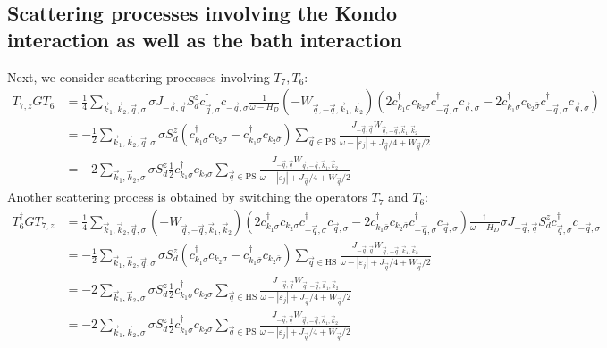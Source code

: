 \documentclass{revtex4-2}
\begin{document}
\subsection{Scattering processes involving the Kondo interaction as well as the bath interaction}
Next, we consider scattering processes involving \(T_7, T_6\):
\begin{equation}\begin{aligned}\label{t7t6}
	T_{7,z} G T_6 &= \frac{1}{4}\sum_{\vec k_1,\vec k_2,\vec q,\sigma}\sigma J_{-\vec q,\vec q}S_d^z c^\dagger_{\vec q,\sigma} c_{-\vec q,\sigma} \frac{1}{\omega - H_D} \left(- W_{\vec q,-\vec q,\vec k_1, \vec k_2}\right) \left(2 c^\dagger_{k_1\sigma}c_{k_2\sigma}c^\dagger_{-\vec q,\sigma}c_{\vec q,\sigma} - 2 c^\dagger_{k_1\bar\sigma}c_{k_2\bar\sigma}c^\dagger_{-\vec q,\sigma}c_{\vec q,\sigma}\right)\\
			      &= -\frac{1}{2}\sum_{\vec k_1,\vec k_2,\vec q,\sigma}\sigma S_d^z \left(c^\dagger_{k_1\sigma}c_{k_2\sigma} - c^\dagger_{k_1\bar\sigma}c_{k_2\bar\sigma}\right) \sum_{\vec q \in \text{PS}}\frac{J_{-\vec q,\vec q} W_{\vec q,-\vec q,\vec k_1, \vec k_2}}{\omega - |\varepsilon_j| + J_{\vec q}/4 + W_{\vec q}/2} \\
			      &= -2\sum_{\vec k_1,\vec k_2,\sigma}\sigma S_d^z \frac{1}{2}c^\dagger_{k_1\sigma}c_{k_2\sigma} \sum_{\vec q \in \text{PS}}\frac{J_{-\vec q,\vec q} W_{\vec q,-\vec q,\vec k_1, \vec k_2}}{\omega - |\varepsilon_j| + J_{\vec q}/4 + W_{\vec q}/2} 
\end{aligned}\end{equation}
Another scattering process is obtained by switching the operators \(T_7\) and \(T_6\):
\begin{equation}\begin{aligned}\label{t6t7}
	T_{6}^\dagger G T_{7,z} &= \frac{1}{4}\sum_{\vec k_1,\vec k_2,\vec q,\sigma} \left(- W_{\vec q,-\vec q,\vec k_1, \vec k_2}\right) \left(2 c^\dagger_{k_1\sigma}c_{k_2\sigma}c^\dagger_{-\vec q,\sigma}c_{\vec q,\sigma} - 2 c^\dagger_{k_1\bar\sigma}c_{k_2\bar\sigma}c^\dagger_{-\vec q,\sigma}c_{\vec q,\sigma}\right) \frac{1}{\omega - H_D} \sigma J_{-\vec q,\vec q}S_d^z c^\dagger_{\vec q,\sigma} c_{-\vec q,\sigma}\\
			      &= -\frac{1}{2}\sum_{\vec k_1,\vec k_2,\vec q,\sigma}\sigma S_d^z \left(c^\dagger_{k_1\sigma}c_{k_2\sigma} - c^\dagger_{k_1\bar\sigma}c_{k_2\bar\sigma}\right) \sum_{\vec q \in \text{HS}}\frac{J_{-\vec q,\vec q} W_{\vec q,-\vec q,\vec k_1, \vec k_2}}{\omega - |\varepsilon_j| + J_{\vec q}/4 + W_{\vec q}/2} \\
			      &= -2\sum_{\vec k_1,\vec k_2,\sigma}\sigma S_d^z \frac{1}{2} c^\dagger_{k_1\sigma}c_{k_2\sigma} \sum_{\vec q \in \text{HS}}\frac{J_{-\vec q,\vec q} W_{\vec q,-\vec q,\vec k_1, \vec k_2}}{\omega - |\varepsilon_j| + J_{\vec q}/4 + W_{\vec q}/2} \\
			      &= -2\sum_{\vec k_1,\vec k_2,\sigma}\sigma S_d^z \frac{1}{2} c^\dagger_{k_1\sigma}c_{k_2\sigma} \sum_{\vec q \in \text{PS}}\frac{J_{-\vec q,\vec q} W_{\vec q,-\vec q,\vec k_1, \vec k_2}}{\omega - |\varepsilon_j| + J_{\vec q}/4 + W_{\vec q}/2} \\
\end{aligned}\end{equation}
\end{document}
